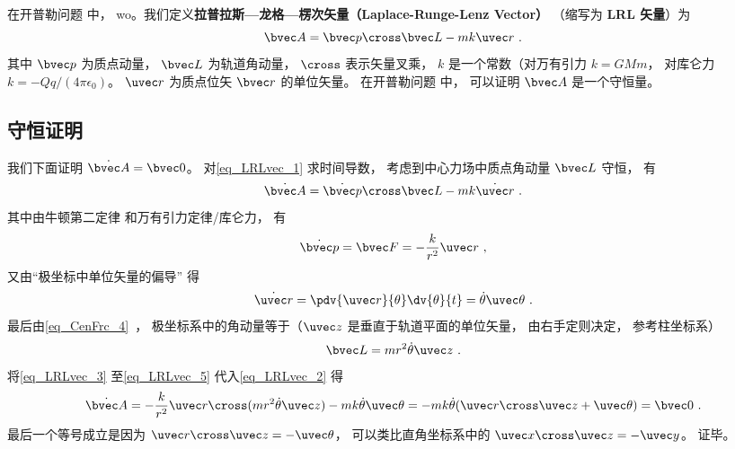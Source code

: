 

在开普勒问题%
中， wo。我们定义\textbf{拉普拉斯—龙格—楞次矢量（Laplace-Runge-Lenz Vector）} （缩写为 \textbf{LRL 矢量}）为
\begin{equation}\label{eq_LRLvec_1}
\bvec A = \bvec p \cross \bvec L - mk \uvec r~.
\end{equation}
其中 $\bvec p$ 为质点动量， $\bvec L$ 为轨道角动量， $\cross$ 表示矢量叉乘， $k$ 是一个常数（对万有引力 $k = GMm$， 对库仑力 $k = -Qq/(4\pi\epsilon_0)$。 $\uvec r$ 为质点位矢 $\bvec r$ 的单位矢量。 在开普勒问题%
中， 可以证明 $\bvec A$ 是一个守恒量。

\subsection{守恒证明}
我们下面证明 $\dot{\bvec A} = \bvec 0$。 对\autoref{eq_LRLvec_1} 求时间导数， 考虑到中心力场中质点角动量 $\bvec L$ 守恒， 有
\begin{equation}\label{eq_LRLvec_2}
\dot{\bvec A} = \dot{\bvec p}\cross \bvec L  - mk\dot{\uvec r}~.
\end{equation}
其中由牛顿第二定律 和万有引力定律/库仑力， 有
\begin{equation}\label{eq_LRLvec_3}
\dot{\bvec p} = \bvec F = - \frac{k}{r^2}\uvec r~,
\end{equation}
又由“极坐标中单位矢量的偏导” 得
\begin{equation}\label{eq_LRLvec_4}
\dot{\uvec r} = \pdv{\uvec r}{\theta} \dv{\theta}{t} = \dot\theta\uvec \theta~.
\end{equation}
最后由\autoref{eq_CenFrc_4}~， 极坐标系中的角动量等于（$\uvec z$ 是垂直于轨道平面的单位矢量， 由右手定则决定， 参考柱坐标系）
\begin{equation}\label{eq_LRLvec_5}
\bvec L = mr^2\dot \theta \uvec z~.
\end{equation}
将\autoref{eq_LRLvec_3} 至\autoref{eq_LRLvec_5} 代入\autoref{eq_LRLvec_2} 得
\begin{equation}
\dot{\bvec A} = -\frac{k}{r^2}\uvec r \cross (mr^2\dot\theta\uvec z) - mk\dot\theta\uvec\theta
=-mk\dot\theta (\uvec r\cross \uvec z + \uvec \theta)
= \bvec 0~.
\end{equation}
最后一个等号成立是因为 $\uvec r\cross\uvec z = -\uvec\theta$， 可以类比直角坐标系中的 $\uvec x\cross\uvec z = -\uvec y$。 证毕。


